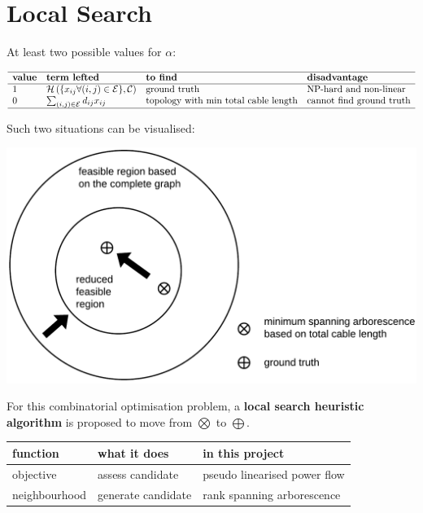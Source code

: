 \documentclass[
]{book}
\begin{document}
\hypertarget{combinatorial}{%
\section{Local Search}\label{combinatorial}}

At least two possible values for \(\alpha\):

\[
\begin{array}{llll}
  \hline
  \textbf{value} & \textbf{term lefted} & \textbf{to find}
  & \textbf{disadvantage} \\
  \hline
  1
  & \mathcal{H}
  \left(\{x_{i j} \forall (i, j) \in \mathcal{E} \}, \mathcal{C} \right)
  & \text{ground truth}
  & \text{NP-hard and non-linear} \\
  0
  & \sum_{(i, j) \in \mathcal{E}} d_{i j} x_{i j}
  & \text{topology with min total cable length}
  & \text{cannot find ground truth} \\
  \hline
\end{array}
\]

Such two situations can be visualised:

\begin{center}\includegraphics[width=0.7\linewidth]{Pictures/figFeasibleRegion} \end{center}

For this combinatorial optimisation problem, a \textbf{local search heuristic
algorithm} is proposed to move from \(\bigotimes\) to \(\bigoplus\).
\citep{michiels2007theoretical}

\begin{table}[H]
\centering
\begin{tabular}[t]{l|l|l}
\hline
function & what it does & in this project\\
\hline
objective & assess candidate & pseudo linearised power flow\\
\hline
neighbourhood & generate candidate & rank spanning arborescence\\
\hline
\end{tabular}
\end{table}
\end{document}
